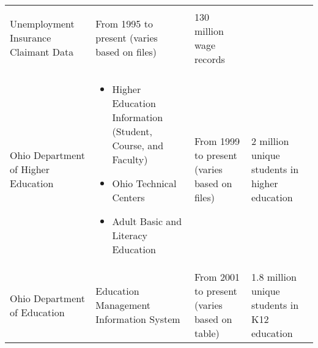 \begin{longtable}[]{@{}llll@{}}
\begin{minipage}[t]{0.34\columnwidth}
\begin{itemize}
    Unemployment Insurance
    Claimant Data
  \end{itemize}\strut
  \end{minipage} & \begin{minipage}[t]{0.18\columnwidth}\raggedright
  From 1995 to
  present
  (varies
  based on
  files)\strut
  \end{minipage} & \begin{minipage}[t]{0.18\columnwidth}\raggedright
  130 million
  wage records\strut
  \end{minipage}\tabularnewline
  \begin{minipage}[t]{0.19\columnwidth}\raggedright
  Ohio
  Department
  of Higher
  Education\strut
  \end{minipage} & \begin{minipage}[t]{0.34\columnwidth}\raggedright
  \begin{itemize}
  \tightlist
  \item
    Higher Education
    Information (Student,
    Course, and Faculty)
  \item
    Ohio Technical Centers
  \item
    Adult Basic and Literacy
    Education
  \end{itemize}\strut
  \end{minipage} & \begin{minipage}[t]{0.18\columnwidth}\raggedright
  From 1999 to
  present
  (varies
  based on
  files)\strut
  \end{minipage} & \begin{minipage}[t]{0.18\columnwidth}\raggedright
  2 million
  unique
  students in
  higher
  education\strut
  \end{minipage}\tabularnewline
  \begin{minipage}[t]{0.19\columnwidth}\raggedright
  Ohio
  Department
  of
  Education\strut
  \end{minipage} & \begin{minipage}[t]{0.34\columnwidth}\raggedright
  Education Management
  Information System\strut
  \end{minipage} & \begin{minipage}[t]{0.18\columnwidth}\raggedright
  From 2001 to
  present
  (varies
  based on
  table)\strut
  \end{minipage} & \begin{minipage}[t]{0.18\columnwidth}\raggedright
  1.8 million
  unique
  students in
  K12
  education\strut
  \end{minipage}\tabularnewline

\end{longtable}
